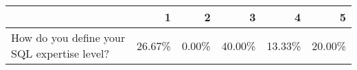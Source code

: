 \begin{table}[tb]
\begin{tabular}{@{}C{4cm}rrrrr@{}}
                                                                  & \textbf{1}                                 & \textbf{2}                                         & \textbf{3}                                          & \textbf{4}                                     & \textbf{5}                                           \\ \midrule
  How do you define your SQL expertise level?                     & 26.67\%                                    & 0.00\%                                             & 40.00\%                                             & 13.33\%                                        & 20.00\%                                               \\ \bottomrule
  \end{tabular}
  \end{table}


